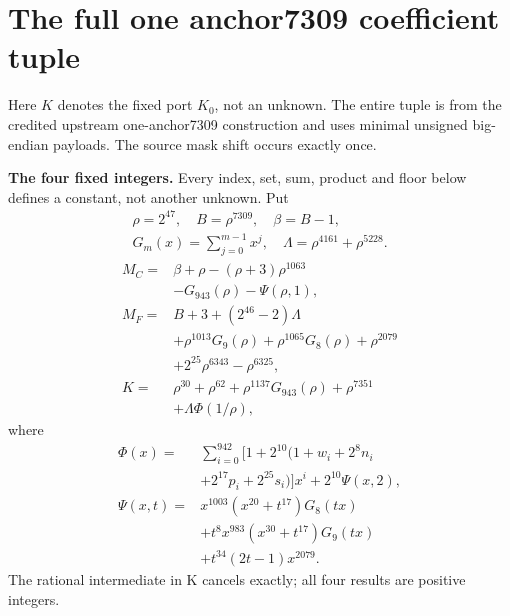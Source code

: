 \section{The full one anchor7309 coefficient tuple}
\begingroup
\providecommand{\fl}[1]{\left\lfloor#1\right\rfloor}
\providecommand{\rg}[2]{\{#1,\ldots,#2\}}
Here $K$ denotes the fixed port $K_0$, not an unknown. The entire tuple is
from the credited upstream one-anchor7309 construction and uses minimal
unsigned big-endian payloads. The source mask shift occurs exactly once.

\textbf{The four fixed integers.}
Every index, set, sum, product and floor below defines a constant, not
another unknown. Put
\[
\begin{gathered}
\rho=2^{47},\quad B=\rho^{7309},\quad\beta=B-1,\\
G_m(x)=\sum_{j=0}^{m-1}x^j,\quad
\Lambda=\rho^{4161}+\rho^{5228}.
\end{gathered}
\]
\begin{align*}
M_C={}&\beta+\rho-(\rho+3)\rho^{1063}\\
&-G_{943}(\rho)-\Psi(\rho,1),\\
M_F={}&B+3+(2^{46}-2)\Lambda\\
&+\rho^{1013}G_9(\rho)+\rho^{1065}G_8(\rho)
  +\rho^{2079}\\
&+2^{25}\rho^{6343}-\rho^{6325},\\
K={}&\rho^{30}+\rho^{62}+\rho^{1137}G_{943}(\rho)+\rho^{7351}\\
&+\Lambda\Phi(1/\rho),
\end{align*}
where
\[
\begin{split}
\Phi(x)={}&\sum_{i=0}^{942}[1+2^{10}(1+w_i+2^8n_i\\
&+2^{17}p_i+2^{25}s_i)]x^i+2^{10}\Psi(x,2),\\
\Psi(x,t)={}&x^{1003}(x^{20}+t^{17})G_8(tx)\\
&+t^8x^{983}(x^{30}+t^{17})G_9(tx)\\
&+t^{34}(2t-1)x^{2079}.
\end{split}
\]
The rational intermediate in K cancels exactly; all four results are positive integers.

